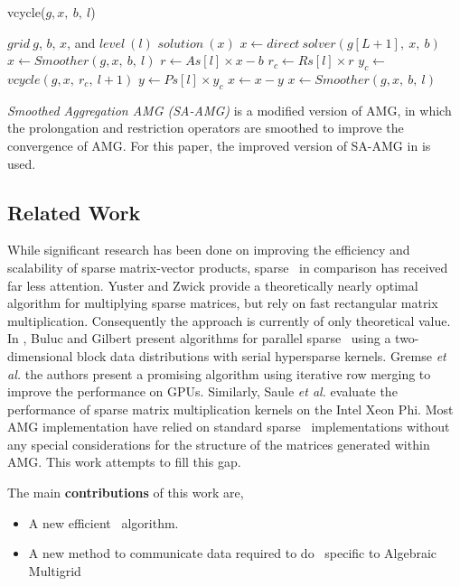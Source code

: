 \begin{algorithm}[ht] 
  \caption{vcycle($g, x,\ b,\ l$)} \label{alg:vcycle} 
  \begin{algorithmic}[1]
    \Require $grid\ g$, $b$, $x$, and $level\ (l)$
    \Ensure  $solution\ (x)$
      \State $x \leftarrow direct\ solver(g[L+1],\ x,\ b)$
    \Else
      \State $x \leftarrow Smoother(g, x,\ b,\ l)$
      \State $r \leftarrow As[l] \times x - b$
      \State $r_c \leftarrow Rs[l] \times r$
      \State $y_c \leftarrow$ $vcycle(g, x,\ r_c,\ l+1)$
      \State $y \leftarrow Ps[l] \times y_c$
      \State $x \leftarrow x - y$
      \State $x \leftarrow Smoother(g, x,\ b,\ l)$
    \EndIf
  \end{algorithmic}
\end{algorithm}

\textit{Smoothed Aggregation AMG (SA-AMG)}\cite{Vanek:1995} is a modified version of AMG,
in which the prolongation and restriction operators are smoothed %
to improve the convergence of AMG.
For this paper, the improved version of SA-AMG in \cite{treister2015non} is used.


\subsection{Related Work}

While significant research has been done on improving the efficiency and scalability of sparse matrix-vector products, sparse \mm\ in comparison has received far less attention. Yuster and Zwick \cite{Yuster2005} provide a theoretically nearly optimal algorithm for multiplying sparse matrices, but rely on fast rectangular matrix multiplication. Consequently the approach is currently of only theoretical value. In \cite{Buluc12}, Buluc and Gilbert present algorithms for parallel sparse \mm\ using a two-dimensional block data distributions with serial hypersparse kernels. 
Gremse {\em et al.} \cite{Gremse15} the authors present a promising algorithm using iterative row merging to improve the performance on GPUs. Similarly, Saule {\em et al.} \cite{Saule14} evaluate the performance of sparse matrix multiplication kernels on the Intel Xeon Phi. Most AMG implementation have relied on standard sparse \mm\ implementations without any special considerations for the structure of the matrices generated within AMG. This work attempts to fill this gap. 

The main {\bf contributions} of this work are,
\begin{itemize}
  \item A new efficient \mm\ algorithm.
  \item A new method to communicate data required to do \mm~specific to Algebraic Multigrid
\end{itemize}

